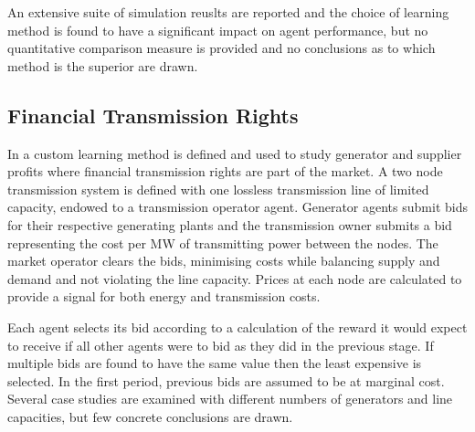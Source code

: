 An extensive suite of simulation reuslts are reported and the choice of
learning method is found to have a significant impact on agent performance, but
no quantitative comparison measure is provided and no conclusions as to which
method is the superior are drawn.

\subsection{Financial Transmission Rights}
In \cite{ernst:04} a custom learning method is defined and used to study
generator and supplier profits where financial transmission rights are part of
the market.  A two node transmission system is defined with one lossless
transmission line of limited capacity, endowed to a transmission operator
agent.  Generator agents submit bids for their respective generating plants
and the transmission owner submits a bid representing the cost per MW of
transmitting power between the nodes.  The market operator clears the bids,
minimising costs while balancing supply and demand and not violating the line
capacity.  Prices at each node are calculated to provide a signal for both
energy and transmission costs.

Each agent selects its bid according to a
calculation of the reward it would expect to receive if all other agents were
to bid as they did in the previous stage.  If multiple bids are found to have
the same value then the least expensive is selected.  In the first period,
previous bids are assumed to be at marginal cost.  Several case studies are
examined with different numbers of generators and line capacities, but few
concrete conclusions are drawn.


